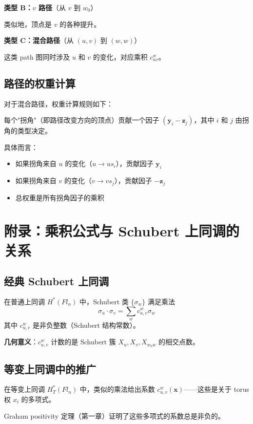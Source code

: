 \textbf{类型 B：$v$ 路径}（从 $v$ 到 $w_0$）

类似地，顶点是 $v$ 的各种提升。

\textbf{类型 C：混合路径}（从 $(u,v)$ 到 $(w,w)$）

这类 path 图同时涉及 $u$ 和 $v$ 的变化，对应乘积 $c_{uv}^w$。

\subsection*{路径的权重计算}

对于混合路径，权重计算规则如下：

每个"拐角"（即路径改变方向的顶点）贡献一个因子 $(\mathbf{y}_i - \mathbf{z}_j)$，其中 $i$ 和 $j$ 由拐角的类型决定。

具体而言：
\begin{itemize}
\item 如果拐角来自 $u$ 的变化（$u \to us_i$），贡献因子 $\mathbf{y}_i$
\item 如果拐角来自 $v$ 的变化（$v \to vs_j$），贡献因子 $-\mathbf{z}_j$
\item 总权重是所有拐角因子的乘积
\end{itemize}

\section{附录：乘积公式与 Schubert 上同调的关系}
\label{sec:appendix-ch2-schubert-cohomology}

\subsection*{经典 Schubert 上同调}

在普通上同调 $H^*(Fl_n)$ 中，Schubert 类 $\{\sigma_w\}$ 满足乘法
$$\sigma_u \cdot \sigma_v = \sum_w c_{u,v}^w \sigma_w$$
其中 $c_{u,v}^w$ 是非负整数（Schubert 结构常数）。

\textbf{几何意义}：$c_{u,v}^w$ 计数的是 Schubert 簇 $X_u, X_v, X_{w_0 w}$ 的相交点数。

\subsection*{等变上同调中的推广}

在等变上同调 $H_T^*(Fl_n)$ 中，类似的乘法给出系数 $c_{u,v}^w(\mathbf{x})$——这些是关于 torus 权 $x_i$ 的多项式。

Graham positivity 定理（第一章）证明了这些多项式的系数总是非负的。

